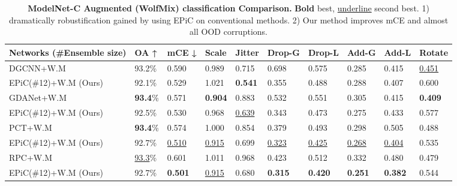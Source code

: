 \documentclass[10pt,twocolumn]{article}
\begin{document}
\begin{table*}
  \centering
\begin{tabular}{p{3.9cm} || p{1.0cm} p{1.0cm} p{1.0cm} p{1.0cm} p{1.1cm} p{1.1cm} p{1.1cm} p{1.0cm} p{0.8cm}}
    \hline
    Networks (\#Ensemble size)& OA ↑ & mCE ↓ & Scale & Jitter & Drop-G & Drop-L & Add-G & Add-L & Rotate \\
    \hline
    DGCNN\cite{dgcnn}+W.M & 93.2\% & 0.590 & 0.989 &  0.715 & 0.698 & 0.575 & 0.285 & 0.415 & \underline{0.451}\\
    \hspace*{0.2cm} EPiC(\#12)+W.M (Ours) & 92.1\% & 0.529 & 1.021 &  \textbf{0.541} & 0.355 & 0.488 & 0.288 & 0.407 & 0.600\\
    \hline
    GDANet\cite{gdanet}+W.M & \textbf{93.4}\% & 0.571 & \textbf{0.904} &  0.883 & 0.532 &  0.551 & 0.305 & 0.415 & \textbf{0.409}\\
    \hspace*{0.2cm} EPiC(\#12)+W.M (Ours) & 92.5\% & 0.530 & 0.968 & \underline{0.639} & 0.343 & 0.473 & 0.275 & 0.433 & 0.577\\
    \hline
    PCT\cite{pct}+W.M & \textbf{93.4}\% & 0.574 & 1.000 &  0.854 & 0.379 &  0.493 & 0.298 & 0.505 &  0.488\\
    \hspace*{0.2cm} EPiC(\#12)+W.M (Ours) & 92.7\% & \underline{0.510} & \underline{0.915} &  0.699 & \underline{0.323} & \underline{0.425} & \underline{0.268} & \underline{0.404} & 0.535\\
    \hline
    RPC\cite{modelnetc}+W.M & \underline{93.3}\% & 0.601 & 1.011 &  0.968 & 0.423 &  0.512 & 0.332 & 0.480 & 0.479\\
    \hspace*{0.2cm} EPiC(\#12)+W.M (Ours) & 92.7\% & \textbf{0.501} & \underline{0.915} &  0.680 & \textbf{0.315} & \textbf{0.420} & \textbf{0.251} & \textbf{0.382} & 0.544\\
    \hline
  \end{tabular}
  \caption{{\bf ModelNet-C Augmented 
  (WolfMix) classification Comparison.} {\bf Bold} best, \underline{underline} second best. 1) dramatically robustification gained by using EPiC on conventional methods. 2) Our method improves mCE and almost all OOD corruptions.}
  \label{table:comparison_augmented}
\end{table*}
\end{document}
